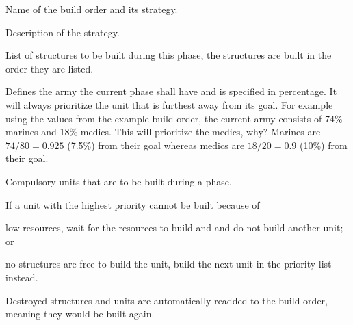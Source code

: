 \begin{function_description}
	\item[\textless name\textgreater] Name of the build order and its strategy.
	\item[\textless description\textgreater] Description of the strategy.
	\item[\textless build-order\textgreater] List of structures to be built during this phase, the structures are built in the order they are listed.
	\item[\textless units\textgreater] Defines the army the current phase shall have and is specified in percentage. It will always prioritize the unit that is furthest away from its goal. For example using the values from the example build order, the current army consists of 74\% marines and 18\% medics. This will prioritize the medics, why? Marines are $74/80 =  0.925$ (7.5\%) from their goal whereas medics are $18/20 = 0.9$ (10\%) from their goal.
	\item[\textless must-have\textgreater] Compulsory units that are to be built during a phase.
\end{function_description}

If a unit with the highest priority cannot be built because of
\begin{inparaenum}[a\upshape)]
	\item low resources, wait for the resources to build and and do not build another unit; or
	\item no structures are free to build the unit, build the next unit in the priority list instead.
\end{inparaenum}

Destroyed structures and units are automatically readded to the build order, meaning they would be built again.
